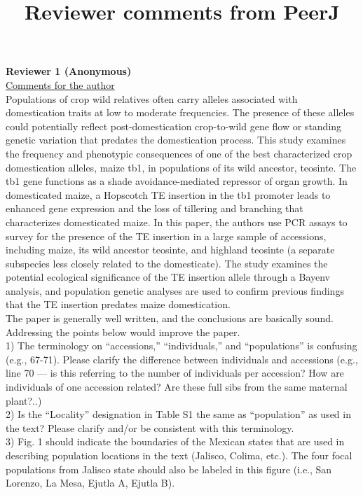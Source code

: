 \documentclass[]{article}
\begin{document}
\title{Reviewer comments from PeerJ}
\textbf{Reviewer 1 (Anonymous)}\\

\underline{Comments for the author}\\

Populations of crop wild relatives often carry alleles associated with domestication traits at low to moderate frequencies. The presence of these alleles could potentially reflect post-domestication crop-to-wild gene flow or standing genetic variation that predates the domestication process. This study examines the frequency and phenotypic consequences of one of the best characterized crop domestication alleles, maize tb1, in populations of its wild ancestor, teosinte. The tb1 gene functions as a shade avoidance-mediated repressor of organ growth. In domesticated maize, a Hopscotch TE insertion in the tb1 promoter leads to enhanced gene expression and the loss of tillering and branching that characterizes domesticated maize. In this paper, the authors use PCR assays to survey for the presence of the TE insertion in a large sample of accessions, including maize, its wild ancestor teosinte, and highland teosinte (a separate subspecies less closely related to the domesticate). The study examines the potential ecological significance of the TE insertion allele through a Bayenv analysis, and population genetic analyses are used to confirm previous findings that the TE insertion predates maize domestication.\\ 

The paper is generally well written, and the conclusions are basically sound. Addressing the points below would improve the paper. \\

1) The terminology on “accessions,” “individuals,” and “populations” is confusing (e.g., 67-71). Please clarify the difference between individuals and accessions (e.g., line 70 — is this referring to the number of individuals per accession? How are individuals of one accession related? Are these full sibs from the same maternal plant?..) \\

2) Is the “Locality” designation in Table S1 the same as “population” as used in the text? Please clarify and/or be consistent with this terminology.\\

3) Fig. 1 should indicate the boundaries of the Mexican states that are used in describing population locations in the text (Jalisco, Colima, etc.). The four focal populations from Jalisco state should also be labeled in this figure (i.e., San Lorenzo, La Mesa, Ejutla A, Ejutla B).\\
\end{document}
